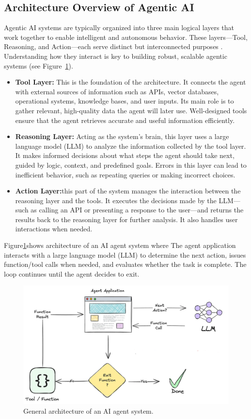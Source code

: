 \subsection{Architecture Overview of Agentic AI}

Agentic AI systems are typically organized into three main logical layers that work together to enable intelligent and autonomous behavior. These layers—Tool, Reasoning, and Action—each serve distinct but interconnected purposes \citep{vectorize2025agentarchitectures}. Understanding how they interact is key to building robust, scalable agentic systems  (see Figure~\ref{architecture}).

\begin{itemize}
	\item \textbf{Tool Layer:} This is the foundation of the architecture. It connects the agent with external sources of information such as APIs, vector databases, operational systems, knowledge bases, and user inputs. Its main role is to gather relevant, high-quality data the agent will later use. Well-designed tools ensure that the agent retrieves accurate and useful information efficiently.
	
	\item \textbf{Reasoning Layer:} Acting as the system’s brain, this layer uses a large language model (LLM) to analyze the information collected by the tool layer. It makes informed decisions about what steps the agent should take next, guided by logic, context, and predefined goals. Errors in this layer can lead to inefficient behavior, such as repeating queries or making incorrect choices.
	
	\item \textbf{Action Layer:}this part of the system manages the interaction between the reasoning layer and the tools. It executes the decisions made by the LLM—such as calling an API or presenting a response to the user—and returns the results back to the reasoning layer for further analysis. It also handles user interactions when needed.
\end{itemize}
Figure\ref{architecture}shows architecture of an AI agent system where The agent application interacts with a large language model (LLM) to determine the next action, issues function/tool calls when needed, and evaluates whether the task is complete. The loop continues until the agent decides to exit.
\begin{figure}[h]
	\centering
	\includegraphics[width=0.8\linewidth]{Figures/aiagent.png}
	\caption{General architecture of an AI agent system.  }
	\label{architecture}
	
\end{figure}
